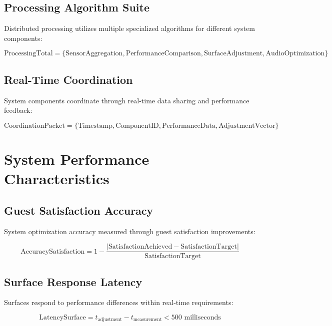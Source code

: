 \documentclass[12pt,a4paper]{article}
\begin{document}
\subsection{Processing Algorithm Suite}

Distributed processing utilizes multiple specialized algorithms for different system components:

\begin{equation}
\text{ProcessingTotal} = \{\text{SensorAggregation}, \text{PerformanceComparison}, \text{SurfaceAdjustment}, \text{AudioOptimization}\}
\end{equation}

\subsection{Real-Time Coordination}

System components coordinate through real-time data sharing and performance feedback:

\begin{equation}
\text{CoordinationPacket} = \{\text{Timestamp}, \text{ComponentID}, \text{PerformanceData}, \text{AdjustmentVector}\}
\end{equation}

\section{System Performance Characteristics}

\subsection{Guest Satisfaction Accuracy}

System optimization accuracy measured through guest satisfaction improvements:

\begin{equation}
\text{AccuracySatisfaction} = 1 - \frac{|\text{SatisfactionAchieved} - \text{SatisfactionTarget}|}{\text{SatisfactionTarget}}
\end{equation}

\subsection{Surface Response Latency}

Surfaces respond to performance differences within real-time requirements:

\begin{equation}
\text{LatencySurface} = t_{\text{adjustment}} - t_{\text{measurement}} < 500 \text{ milliseconds}
\end{equation}
\end{document}
